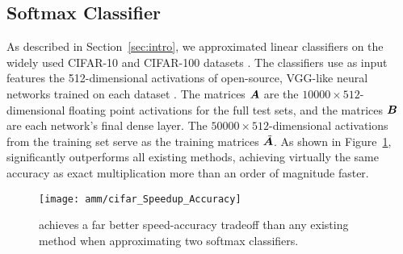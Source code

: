 \vspace{-2mm}
\subsection{Softmax Classifier}
\vspace{-.5mm}

As described in Section~\ref{sec:intro}, we approximated linear classifiers on the widely used CIFAR-10 and CIFAR-100 datasets \cite{cifarDsets}. The classifiers use as input features the 512-dimensional activations of open-source, VGG-like neural networks trained on each dataset \cite{cifarVgg}. The matrices $\bm{A}$ are the $10000 \times 512$-dimensional floating point activations for the full test sets, and the matrices $\bm{B}$ are each network's final dense layer. The $50000 \times 512$-dimensional activations from the training set serve as the training matrices $\tilde{\bm{A}}$.
As shown in Figure~\ref{fig:cifar}, \oursp significantly outperforms all existing methods, achieving virtually the same accuracy as exact multiplication more than an order of magnitude faster.

\begin{figure}[h]
\begin{center}
\texttt{[image: amm/cifar\_Speedup\_Accuracy]}
\caption{\oursp achieves a far better speed-accuracy tradeoff than any existing method when approximating two softmax classifiers.}
\label{fig:cifar}
\end{center}
\end{figure}



